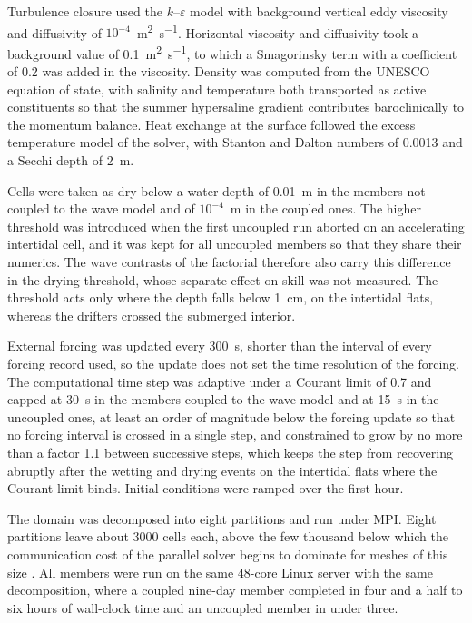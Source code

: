 \documentclass[12pt]{article}
\begin{document}
Turbulence closure used the $k$--$\varepsilon$ model with background vertical
eddy viscosity and diffusivity of $10^{-4}$~\si{\metre\squared\per\second}.
Horizontal viscosity and diffusivity took a background value of
0.1~\si{\metre\squared\per\second}, to which a Smagorinsky term with a
coefficient of 0.2 was added in the viscosity. Density was computed from the
UNESCO equation of state, with salinity and temperature both transported as
active constituents so that the summer hypersaline gradient contributes
baroclinically to the momentum balance. Heat exchange at the surface followed
the excess temperature model of the solver, with Stanton and Dalton numbers of
0.0013 and a Secchi depth of 2~m.

Cells were taken as dry below a water depth of 0.01~m in the members not
coupled to the wave model and of $10^{-4}$~m in the coupled ones. The higher
threshold was introduced when the first uncoupled run aborted on an
accelerating intertidal cell, and it was kept for all uncoupled members so
that they share their numerics. The wave contrasts of the factorial therefore
also carry this difference in the drying threshold, whose separate effect on
skill was not measured. The threshold acts only where the depth falls below
1~cm, on the intertidal flats, whereas the drifters crossed the submerged
interior.

External forcing was updated every 300~s, shorter than the interval of every
forcing record used, so the update does not set the time resolution of the
forcing. The computational time step was adaptive under a Courant limit of 0.7
and capped at 30~s in the members coupled to the wave model and at 15~s in the
uncoupled ones, at least an order of magnitude below the forcing update so that
no forcing interval is crossed in a single step, and constrained to grow by no
more than a factor 1.1 between successive steps, which keeps the step from
recovering abruptly after the wetting and drying events on the intertidal flats
where the Courant limit binds. Initial conditions were ramped over the first
hour.

The domain was decomposed into eight partitions and run under MPI. Eight
partitions leave about 3000 cells each, above the few thousand below which the
communication cost of the parallel solver begins to dominate for meshes of this
size \citep{Moge2019}. All members were run on the same 48-core Linux server
with the same decomposition, where a coupled nine-day member completed in four
and a half to six hours of wall-clock time and an uncoupled member in under
three.
\end{document}

